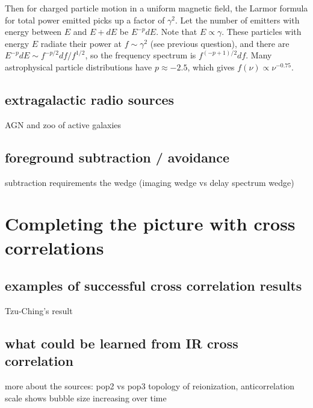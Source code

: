 Then for charged particle motion in a uniform magnetic field, the Larmor formula for total power emitted picks up a factor of $\gamma^2$. Let the number of emitters with energy between $E$ and $E+dE$ be $E^{-p}dE$. Note that $E\propto\gamma$. These particles with energy $E$ radiate their power at $f\sim\gamma^2$ (see previous question), and there are $E^{-p}dE\sim f^{-p/2}df/f^{1/2}$, so the frequency spectrum is $f^{(-p+1)/2}df$. Many astrophysical particle distributions have $p\approx-2.5$, which gives $f(\nu)\propto\nu^{-0.75}$.

\subsection{extragalactic radio sources}


AGN and zoo of active galaxies

\subsection{foreground subtraction / avoidance}

subtraction requirements
the wedge (imaging wedge vs delay spectrum wedge)

\section{Completing the picture with cross correlations}

\subsection{examples of successful cross correlation results}
Tzu-Ching's result \citep{Chang2010,Masui2013}

\subsection{what could be learned from IR cross correlation}
more about the sources: pop2 vs pop3
topology of reionization, anticorrelation scale shows bubble size increasing over time

\citep{Heneka2016}
\citep{Fernandez2014,Silva2012,Mao2014,Lidz2008,Gong2014,Fernandez2013}

